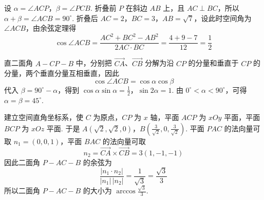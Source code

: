 \begin{solution}
设 \(\alpha=\angle ACP\)，\(\beta=\angle PCB\). 折叠前 \(P\) 在斜边 \(AB\) 上，且 \(AC\perp BC\)，所以 \(\alpha+\beta=\angle ACB=90^\circ\). 折叠后 \(AC=2\)，\(BC=3\)，\(AB=\sqrt{7}\)，设此时空间角为 \(\angle ACB\)，由余弦定理得
\[
\cos\angle ACB=\frac{AC^2+BC^2-AB^2}{2AC\cdot BC}=\frac{4+9-7}{12}=\frac{1}{2}
\]

直二面角 \(A-CP-B\) 中，分别把 \(\overrightarrow{CA}\)、\(\overrightarrow{CB}\) 分解为沿 \(CP\) 的分量和垂直于 \(CP\) 的分量，两个垂直分量互相垂直，因此
\[
\cos\angle ACB=\cos\alpha\cos\beta
\]
代入 \(\beta=90^\circ-\alpha\)，得到
\(\cos\alpha\sin\alpha=\frac{1}{2}\)，\(\sin 2\alpha=1\).
由 \(0^\circ<\alpha<90^\circ\)，可得 \(\alpha=\beta=45^\circ\).

建立空间直角坐标系，使 \(C\) 为原点，\(CP\) 为 \(x\) 轴，平面 \(ACP\) 为 \(xOy\) 平面，平面 \(BCP\) 为 \(xOz\) 平面. 于是
\(A\left(\sqrt{2},\sqrt{2},0\right)\)，\(B\left(\frac{3}{\sqrt{2}},0,\frac{3}{\sqrt{2}}\right)\).
平面 \(PAC\) 的法向量可取 \(n_1=(0,0,1)\)，平面 \(BAC\) 的法向量可取
\[
n_2=\overrightarrow{CA}\times\overrightarrow{CB}=3(1,-1,-1)
\]
因此二面角 \(P-AC-B\) 的余弦为
\[
\frac{|n_1\cdot n_2|}{|n_1|\,|n_2|}=\frac{1}{\sqrt{3}}=\frac{\sqrt{3}}{3}
\]
所以二面角 \(P-AC-B\) 的大小为 \(\arccos\frac{\sqrt{3}}{3}\).
\end{solution}
